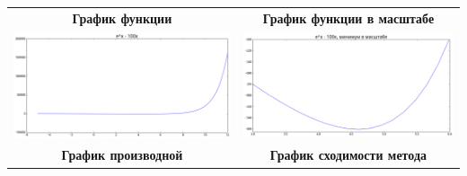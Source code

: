 \documentclass[12pt, a4paper]{article}
\begin{document}
        \begin{center}
            \begin{tabular}{c c}
                \textbf{График функции} & \textbf{График функции в масштабе} \\

                \includegraphics[width=\picwidth]{spec_sec.png} &
                \includegraphics[width=\picwidth]{spec_sec_scaled.png} \\

                \textbf{График производной} & \textbf{График сходимости метода} \\


\end{tabular}
\end{center}
\end{document}
